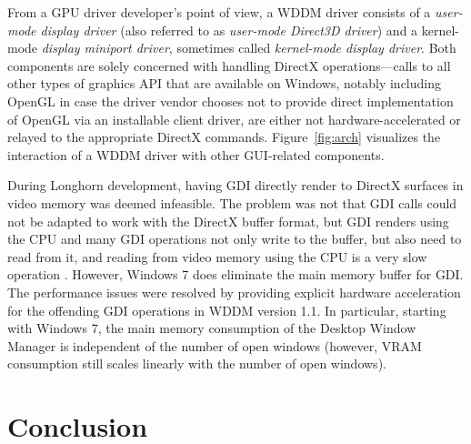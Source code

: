 			From a GPU driver developer's point of view, a WDDM driver consists
			of a \textit{user-mode display driver} (also referred to as
			\textit{user-mode Direct3D driver}) and a kernel-mode
			\textit{display miniport driver}, sometimes called \textit{kernel-mode
			display driver}. Both components are solely concerned with handling
			DirectX operations---calls to all other types of graphics API that
			are available on Windows, notably including OpenGL in case the driver
			vendor chooses not to provide direct implementation of OpenGL via
			an installable client driver, are either not
			hardware-accelerated or relayed to the appropriate DirectX commands.
			Figure~\ref{fig:arch} visualizes the interaction of a WDDM driver with
			other GUI-related components.
			\cite{wddmarch,d2dvsgdi}

			During Longhorn development, having GDI directly render to DirectX
			surfaces in video memory was deemed infeasible. The problem
			was not that GDI calls
			could not be adapted to work with the DirectX buffer format, but
			GDI renders using the CPU and many GDI operations not only write to
			the buffer, but also need to read from it, and reading from video memory
			using the CPU is a very slow operation \cite{dwmredirect}. However,
			Windows 7 does eliminate the main memory buffer for GDI. The performance
			issues were resolved by providing explicit hardware acceleration for
			the offending GDI operations in WDDM version 1.1. In particular,
			starting with Windows 7, the
			main memory consumption of the Desktop Window Manager is independent
			of the number of open windows (however, VRAM consumption still scales
			linearly with the number of open windows).
			\cite{win7}

	\section{Conclusion}

	\onecolumn{\printbibliography}

